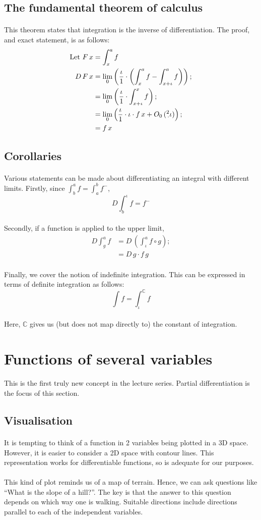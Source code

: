 \documentclass[11pt]{article}
\newcommand*\C{\ensuremath{\mathbb C}}
\newcommand*\id{\iota}
\newcommand*\cd{\cdot}
\newcommand*\prg{\paragraph}
\newcommand*\pt{\prescript}
\begin{document}
\subsection{The fundamental theorem of calculus}
\prg{}This theorem states that integration is the inverse of differentiation. The proof, and exact statement, is as follows:
\[
\begin{aligned}
\textrm{Let }F\,x&=\int^a_xf \\
D\,F\,x&=\lim_0\left(\frac\id 1\cd\left(\int^a_xf-\int^a_{x+\id}f\right)\right); \\
&=\lim_0\left(\frac\id 1\cd\int^x_{x+\id}f\right); \\
&=\lim_0\left(\frac\id 1\cd\id\cd f\,x+O_0\,(\pt 2\cd\id)\right); \\
&=f\,x
\end{aligned}
\]
\subsection{Corollaries}
\prg{}Various statements can be made about differentiating an integral with different limits. Firstly, since $\int^a_bf=\int^b_af^-$,
\[
D\int^\id_bf=f^-
\]
\prg{}Secondly, if a function is applied to the upper limit,
\[
\begin{aligned}
D\int^a_gf&=D\,\left(\int^a_\id f\circ g\right); \\
&=D\,g\cd f\,g
\end{aligned}
\]
\prg{}Finally, we cover the notion of indefinite integration. This can be expressed in terms of definite integration as follows:
\[
\int f=\int^\C_\id f
\]
\prg{}Here, $\C$ gives us (but does not map directly to) the constant of integration.

\section{Functions of several variables}
\prg{}This is the first truly new concept in the lecture series. Partial differentiation is the focus of this section.

\subsection{Visualisation}
\prg{}It is tempting to think of a function in 2 variables being plotted in a 3D space. However, it is easier to consider a 2D space with contour lines. This representation works for differentiable functions, so is adequate for our purposes.

\prg{}This kind of plot reminds us of a map of terrain. Hence, we can ask questions like “What is the slope of a hill?”. The key is that the answer to this question depends on which way one is walking. Suitable directions include directions parallel to each of the independent variables.
\end{document}
